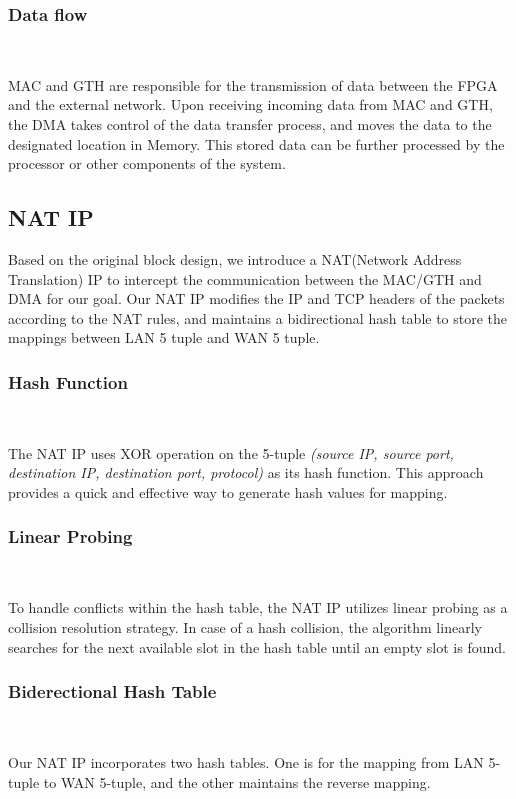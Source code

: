     \subsubsection{Data flow}\

    MAC and GTH are responsible for the transmission of data between the FPGA and the external network. Upon receiving incoming data from MAC and GTH, the DMA takes control of the data transfer process, and moves the data to the designated location in Memory. This stored data can be further processed by the processor or other components of the system.

\subsection{NAT IP}

    Based on the original block design, we introduce a NAT(Network Address Translation) IP to intercept the communication between the MAC/GTH and DMA for our goal. Our NAT IP modifies the IP and TCP headers of the packets according to the NAT rules, and maintains a bidirectional hash table to store the mappings between LAN 5 tuple and WAN 5 tuple.

    \subsubsection{Hash Function}\

    The NAT IP uses XOR operation on the 5-tuple \emph{(source IP, source port, destination IP, destination port, protocol)} as its hash function. This approach provides a quick and effective way to generate hash values for mapping.

    \subsubsection{Linear Probing}\

    To handle conflicts within the hash table, the NAT IP utilizes linear probing as a collision resolution strategy. In case of a hash collision, the algorithm linearly searches for the next available slot in the hash table until an empty slot is found.

    \subsubsection{Biderectional Hash Table}\

    Our NAT IP incorporates two hash tables. One is for the mapping from LAN 5-tuple to WAN 5-tuple, and the other maintains the reverse mapping.

